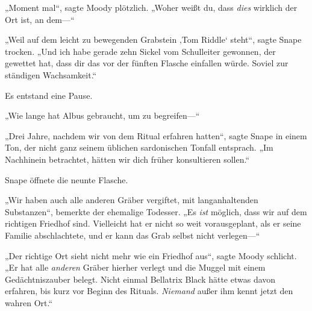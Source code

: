 „Moment mal“, sagte Moody plötzlich. „Woher weißt du, dass \emph{dies} wirklich der Ort ist, an dem—“

„Weil auf dem leicht zu bewegenden Grabstein ‚Tom Riddle‘ steht“, sagte Snape trocken. „Und ich habe gerade zehn Sickel vom Schulleiter gewonnen, der gewettet hat, dass dir das vor der fünften Flasche einfallen würde. Soviel zur ständigen Wachsamkeit.“

Es entstand eine Pause.

„Wie lange hat Albus gebraucht, um zu begreifen—“

„Drei Jahre, nachdem wir von dem Ritual erfahren hatten“, sagte Snape in einem Ton, der nicht ganz seinem üblichen sardonischen Tonfall entsprach. „Im Nachhinein betrachtet, hätten wir dich früher konsultieren sollen.“

Snape öffnete die neunte Flasche.

„Wir haben auch alle anderen Gräber vergiftet, mit langanhaltenden Substanzen“, bemerkte der ehemalige Todesser. „Es \emph{ist} möglich, dass wir auf dem richtigen Friedhof sind. Vielleicht hat er nicht so weit vorausgeplant, als er seine Familie abschlachtete, und er kann das Grab selbst nicht verlegen—“

„Der richtige Ort sieht nicht mehr wie ein Friedhof aus“, sagte Moody schlicht. „Er hat alle \emph{anderen} Gräber hierher verlegt und die Muggel mit einem Gedächtniszauber belegt. Nicht einmal Bellatrix Black hätte etwas davon erfahren, bis kurz vor Beginn des Rituals. \emph{Niemand} außer ihm kennt jetzt den wahren Ort.“

